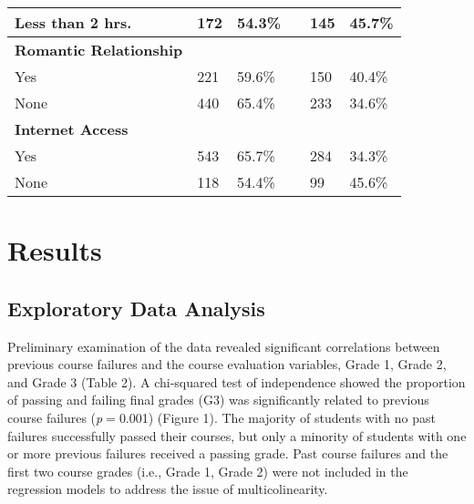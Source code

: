 \documentclass[sigconf]{acmart}
\begin{document}
\begin{table}
\begin{tabular}{llllll}
    Less than 2 hrs.  & 172 & 54.3\% & & 145 & 45.7\% \\
    \midrule
    \textbf{Romantic Relationship} & &  &  &  & \\
    Yes             & 221 & 59.6\% & & 150 & 40.4\%  \\    
    None            & 440 & 65.4\% & & 233 & 34.6\%  \\
    \midrule
    \textbf{Internet Access} & &  &  &  & \\
    Yes             & 543 & 65.7\% & & 284 & 34.3\%  \\    
    None            & 118 & 54.4\% & &  99 & 45.6\%  \\
    \bottomrule
  \end{tabular}
\end{table}

 
\section{Results}

\subsection{Exploratory Data Analysis}

Preliminary examination of the data revealed significant correlations 
between previous course failures and the course evaluation variables,
Grade 1, Grade 2, and Grade 3 (Table 2). A chi-squared test of independence 
showed the proportion of passing and failing final grades (G3) was 
significantly related to previous course failures (\textit{p}$=$0.001)
(Figure 1). The majority of students with no past failures successfully 
passed their courses, but only a minority of students with one or more 
previous failures received a passing grade. Past course failures and 
the first two course grades (i.e., Grade 1, Grade 2) were not included 
in the regression models to address the issue of multicolinearity.

\end{document}
